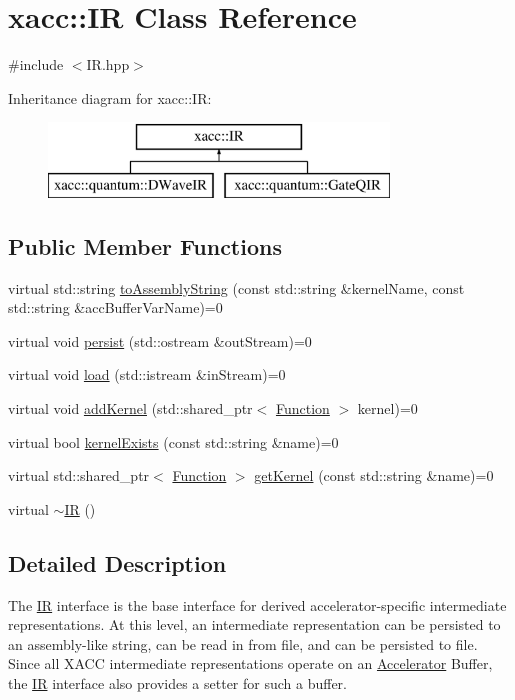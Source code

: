 \hypertarget{a00167}{}\section{xacc\+:\+:IR Class Reference}
\label{a00167}


{\ttfamily \#include $<$I\+R.\+hpp$>$}

Inheritance diagram for xacc\+:\+:IR\+:\begin{figure}[H]
\begin{center}
\leavevmode
\includegraphics[height=2.000000cm]{a00167}
\end{center}
\end{figure}
\subsection*{Public Member Functions}
\begin{DoxyCompactItemize}
\item 
virtual std\+::string \hyperlink{a00167_a8356cdff1919b88eabeb84fd7450cdb6}{to\+Assembly\+String} (const std\+::string \&kernel\+Name, const std\+::string \&acc\+Buffer\+Var\+Name)=0
\item 
virtual void \hyperlink{a00167_a414b72224d88473ad6190bb88102a3ea}{persist} (std\+::ostream \&out\+Stream)=0
\item 
virtual void \hyperlink{a00167_a444c2e4dc0faac500fb70fa93997e9bc}{load} (std\+::istream \&in\+Stream)=0
\item 
virtual void \hyperlink{a00167_abbbf8e6993c518597de32cd05d49d737}{add\+Kernel} (std\+::shared\+\_\+ptr$<$ \hyperlink{a00106}{Function} $>$ kernel)=0
\item 
virtual bool \hyperlink{a00167_afc9ccf5126f3fed19c2e879133b2f6d8}{kernel\+Exists} (const std\+::string \&name)=0
\item 
virtual std\+::shared\+\_\+ptr$<$ \hyperlink{a00106}{Function} $>$ \hyperlink{a00167_a6f49b4ba4b3a15142b04873284885f0d}{get\+Kernel} (const std\+::string \&name)=0
\item 
virtual \hyperlink{a00167_a09a76d71092254acae07e19fa2f34921}{$\sim$\+IR} ()
\end{DoxyCompactItemize}


\subsection{Detailed Description}
The \hyperlink{a00167}{IR} interface is the base interface for derived accelerator-\/specific intermediate representations. At this level, an intermediate representation can be persisted to an assembly-\/like string, can be read in from file, and can be persisted to file. Since all X\+A\+CC intermediate representations operate on an \hyperlink{a00030}{Accelerator} Buffer, the \hyperlink{a00167}{IR} interface also provides a setter for such a buffer. 


